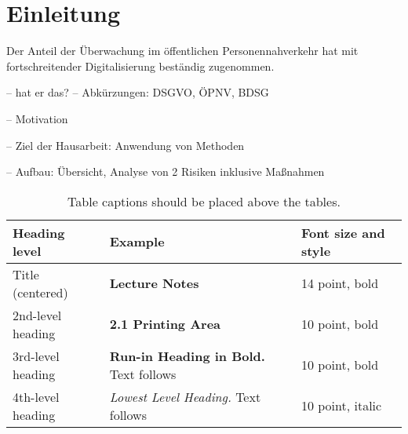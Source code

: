 \section{Einleitung}
Der Anteil der Überwachung im öffentlichen Personennahverkehr hat mit fortschreitender Digitalisierung beständig zugenommen.

-- hat er das?
-- Abkürzungen: DSGVO, ÖPNV, BDSG

-- Motivation

-- Ziel der Hausarbeit: Anwendung von Methoden

-- Aufbau: Übersicht, Analyse von 2 Risiken inklusive Maßnahmen


\begin{table}
    \caption{Table captions should be placed above the
        tables.}\label{tab1}
    \begin{tabular}{|l|l|l|}
        \hline
        Heading level     & Example                                          & Font size and style \\
        \hline
        Title (centered)  & {\Large\bfseries Lecture Notes}                  & 14 point, bold      \\
        2nd-level heading & {\bfseries 2.1 Printing Area}                    & 10 point, bold      \\
        3rd-level heading & {\bfseries Run-in Heading in Bold.} Text follows & 10 point, bold      \\
        4th-level heading & {\itshape Lowest Level Heading.} Text follows    & 10 point, italic    \\
        \hline
    \end{tabular}
\end{table}